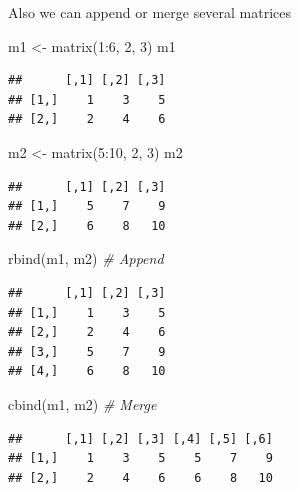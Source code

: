 \documentclass[
]{book}
\newenvironment{Shaded}{\begin{snugshade}}{\end{snugshade}}
\newcommand{\CommentTok}[1]{\textcolor[rgb]{0.56,0.35,0.01}{\textit{#1}}}
\newcommand{\DecValTok}[1]{\textcolor[rgb]{0.00,0.00,0.81}{#1}}
\newcommand{\FunctionTok}[1]{\textcolor[rgb]{0.00,0.00,0.00}{#1}}
\newcommand{\NormalTok}[1]{#1}
\newcommand{\OtherTok}[1]{\textcolor[rgb]{0.56,0.35,0.01}{#1}}
\newcommand{\SpecialCharTok}[1]{\textcolor[rgb]{0.00,0.00,0.00}{#1}}
\begin{document}
Also we can append or merge several matrices

\begin{Shaded}
\begin{Highlighting}[]
\NormalTok{m1 }\OtherTok{\textless{}{-}} \FunctionTok{matrix}\NormalTok{(}\DecValTok{1}\SpecialCharTok{:}\DecValTok{6}\NormalTok{, }\DecValTok{2}\NormalTok{, }\DecValTok{3}\NormalTok{)}
\NormalTok{m1}
\end{Highlighting}
\end{Shaded}

\begin{verbatim}
##      [,1] [,2] [,3]
## [1,]    1    3    5
## [2,]    2    4    6
\end{verbatim}

\begin{Shaded}
\begin{Highlighting}[]
\NormalTok{m2 }\OtherTok{\textless{}{-}} \FunctionTok{matrix}\NormalTok{(}\DecValTok{5}\SpecialCharTok{:}\DecValTok{10}\NormalTok{, }\DecValTok{2}\NormalTok{, }\DecValTok{3}\NormalTok{)}
\NormalTok{m2}
\end{Highlighting}
\end{Shaded}

\begin{verbatim}
##      [,1] [,2] [,3]
## [1,]    5    7    9
## [2,]    6    8   10
\end{verbatim}

\begin{Shaded}
\begin{Highlighting}[]
\FunctionTok{rbind}\NormalTok{(m1, m2) }\CommentTok{\# Append}
\end{Highlighting}
\end{Shaded}

\begin{verbatim}
##      [,1] [,2] [,3]
## [1,]    1    3    5
## [2,]    2    4    6
## [3,]    5    7    9
## [4,]    6    8   10
\end{verbatim}

\begin{Shaded}
\begin{Highlighting}[]
\FunctionTok{cbind}\NormalTok{(m1, m2) }\CommentTok{\# Merge}
\end{Highlighting}
\end{Shaded}

\begin{verbatim}
##      [,1] [,2] [,3] [,4] [,5] [,6]
## [1,]    1    3    5    5    7    9
## [2,]    2    4    6    6    8   10
\end{verbatim}
\end{document}
